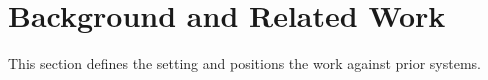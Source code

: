 \section{Background and Related Work}
This section defines the setting and positions the work against prior systems. 
